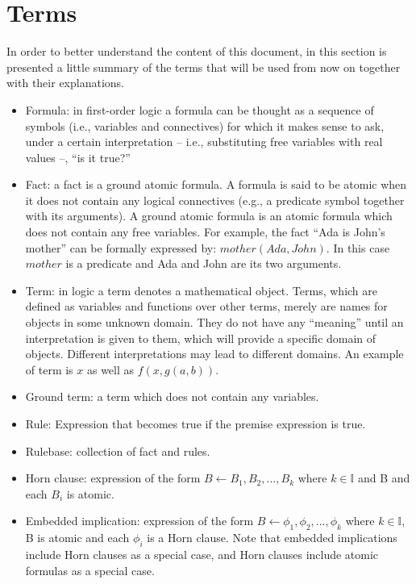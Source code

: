 \section{Terms}
\label{sec:terms}
In order to better understand the content of this document, in this
section is presented a little summary of the terms that will be used from now on together with
their explanations.

\begin{itemize}
  \item Formula: in first-order logic a formula can be thought as a sequence of symbols
    (i.e., variables and connectives) for which it makes sense to ask, under a certain
    interpretation -- i.e., substituting free variables with real values --, ``is it true?''
  \item Fact: a fact is a ground atomic formula.  A formula is said to be atomic when
    it does not contain any logical connectives (e.g., a predicate symbol together with its arguments).
    A ground atomic formula is an atomic formula which does not contain
    any free variables. For example, the fact ``Ada is John's mother'' can be formally expressed
    by: $mother(Ada, John)$. In this case $mother$ is a predicate and Ada and John are its two
    arguments.
  \item Term: in logic a term denotes a mathematical object. Terms, which
    are defined as variables and functions over other terms, merely are names for objects 
    in some unknown domain.     
    They do not have any ``meaning'' until an interpretation is given to them, which will provide a 
    specific domain of objects. Different interpretations may lead to different domains.
    An example of term is $x$ as well as $f(x, g(a, b))$. 
  \item Ground term: a term which does not contain any variables.
  \item Rule: Expression that becomes true if the premise expression is true.
  \item Rulebase: collection of fact and rules.
  \item Horn clause: expression of the form $B \leftarrow B_1,B_2,...,B_k$ where $k \in \mathbb{I}$ and
    B and each $B_i$ is atomic.
  \item Embedded implication: expression of the form $B \leftarrow \phi_1,\phi_2,...,\phi_k$
    where $k \in \mathbb{I}$, B is atomic and each $\phi_i$ is a Horn clause.
    Note that embedded implications include Horn clauses as a special case, and Horn
    clauses include atomic formulas as a special case.

\end{itemize}
